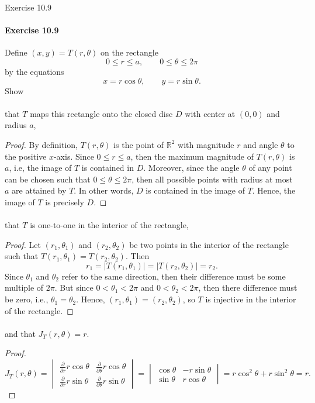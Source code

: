 \documentclass[12pt]{article}
\newenvironment{fullbox}{\begin{lrbox}{\savefullbox}\begin{minipage}{\dimexpr\textwidth-2\fboxsep\relax}}{\end{minipage}\end{lrbox}\begin{center}\framebox[\textwidth]{\usebox{\savefullbox}}\end{center}}
\newenvironment{pbox}[1][]{\begin{fullbox}\ifx#1\empty\else\paragraph{#1}\fi}{\end{fullbox}}
\newcommand{\R}{\mathbb{R}}
\newcommand{\<}{\langle}
\renewcommand{\>}{\rangle}
\newcommand{\mdet}[1]{\begin{vmatrix}#1\end{vmatrix}}
\newcommand{\pdv}[1]{\frac{\partial}{\partial #1}}
\begin{document}
\thispagestyle{title}


\begin{pbox}[Exercise 10.9]
    Define $(x,y)=T(r,\theta)$ on the rectangle
    \[
        0 \leq r \leq a, \qquad 0 \leq \theta \leq 2\pi
    \]
    by the equations
    \[
        x = r\cos{\theta}, \qquad y = r\sin{\theta}.
    \]
    Show
\end{pbox}

\begin{pbox}
    that $T$ maps this rectangle onto the closed disc $D$ with center at $(0,0)$ and radius $a$,
\end{pbox}

\begin{proof}
    By definition, $T(r, \theta)$ is the point of $\R^2$ with magnitude $r$ and angle $\theta$ to the positive $x$-axis. Since $0 \leq r \leq a$, then the maximum magnitude of $T(r, \theta)$ is $a$, i.e, the image of $T$ is contained in $D$. Moreover, since the angle $\theta$ of any point can be chosen such that $0 \leq \theta \leq 2\pi$, then all possible points with radius at most $a$ are attained by $T$. In other words, $D$ is contained in the image of $T$. Hence, the image of $T$ is precisely $D$.

\end{proof}

\begin{pbox}
    that $T$ is one-to-one in the interior of the rectangle,
\end{pbox}

\begin{proof}
    Let $(r_1, \theta_1)$ and $(r_2, \theta_2)$ be two points in the interior of the rectangle such that $T(r_1, \theta_1) = T(r_2, \theta_2)$. Then
    \[
        r_1 = |T(r_1, \theta_1)| = |T(r_2, \theta_2)| = r_2.
    \]
    Since $\theta_1$ and $\theta_2$ refer to the same direction, then their difference must be some multiple of $2\pi$. But since $0 < \theta_1 < 2\pi$ and $0 < \theta_2 < 2\pi$, then there difference must be zero, i.e., $\theta_1 = \theta_2$. Hence, $(r_1, \theta_1) = (r_2, \theta_2)$, so $T$ is injective in the interior of the rectangle.

\end{proof}

\begin{pbox}
    and that $J_T(r,\theta) = r$.
\end{pbox}

\begin{proof}
    \[
        J_T(r,\theta)
            = \mdet{\pdv{r} r\cos\theta & \pdv{\theta} r\cos\theta \\ \pdv{r} r\sin\theta & \pdv{\theta} r\sin\theta}
            = \mdet{\cos\theta & -r\sin\theta \\ \sin\theta & r\cos\theta}
            = r\cos^2\theta + r\sin^2\theta
            = r.
    \]
\end{proof}
\end{document}
